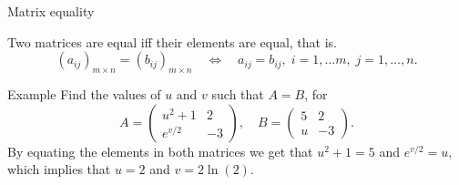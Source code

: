 \documentclass[9pt]{beamer}
\begin{document}
\begin{frame}{Matrix equality}

    Two matrices are equal iff their elements are equal, that is. 
    $$
    (a_{ij})_{m\times n} = (b_{ij})_{m\times n}\quad \Longleftrightarrow\quad a_{ij} = b_{ij},\; i = 1,\dots m,\; j = 1,\dots, n.
    $$

    \begin{block}{Example}
        Find the values of $u$ and $v$ such that $A = B$, for
        $$
        A = 
        \begin{pmatrix}
        u^2 + 1 & 2 \\
        e^{v/2} & -3
        \end{pmatrix},\quad
        B = 
        \begin{pmatrix}
        5 & 2 \\
        u & -3
        \end{pmatrix}.
        $$
        By equating the elements in both matrices we get that $u^2 + 1 = 5$ and $e^{v/2} = u$, which implies that $u = 2$ and $v = 2\ln(2)$.
    \end{block}
    
\end{frame}
\end{document}
